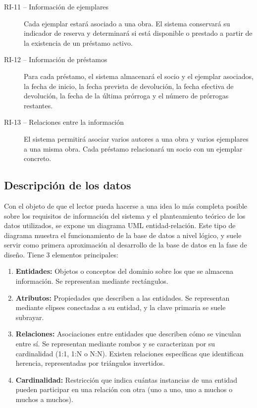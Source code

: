 \begin{description}
	\item[RI-11 -- Información de ejemplares]
	Cada ejemplar estará asociado a una obra. El sistema conservará su indicador de reserva y determinará si está disponible o prestado a partir de la existencia de un préstamo activo.
	
	\item[RI-12 -- Información de préstamos]
	Para cada préstamo, el sistema almacenará el socio y el ejemplar asociados, la fecha de inicio, la fecha prevista de devolución, la fecha efectiva de devolución, la fecha de la última prórroga y el
	número de prórrogas restantes.
	
	\item[RI-13 -- Relaciones entre la información]
	El sistema permitirá asociar varios autores a una obra y varios ejemplares a una misma obra. Cada préstamo relacionará un socio con un ejemplar concreto.
\end{description}
	
	\subsection{Descripción de los datos}
	Con el objeto de que el lector pueda hacerse a una idea lo más completa posible sobre los requisitos de información del sistema y el planteamiento teórico de los datos utilizados, se expone un diagrama UML entidad-relación. Este tipo de diagrama muestra el funcionamiento de la base de datos a nivel lógico, y suele servir como primera aproximación al desarrollo de la base de datos en la fase de diseño. Tiene 3 elementos principales:
	\begin{enumerate}
		\item \textbf{Entidades:} Objetos o conceptos del dominio sobre los que se almacena información. Se representan mediante rectángulos.
		
		\item \textbf{Atributos:} Propiedades que describen a las entidades. Se representan mediante elipses conectadas a su entidad, y la clave primaria se suele subrayar.
		
		\item \textbf{Relaciones:} Asociaciones entre entidades que describen cómo se vinculan entre sí. Se representan mediante rombos y se caracterizan por su cardinalidad (1:1, 1:N o N:N). Existen relaciones específicas que identifican herencia, representadas por triángulos invertidos.
		
		\item \textbf{Cardinalidad:} Restricción que indica cuántas instancias de una entidad pueden participar en una relación con otra (uno a uno, uno a muchos o muchos a muchos).
	\end{enumerate}
	
